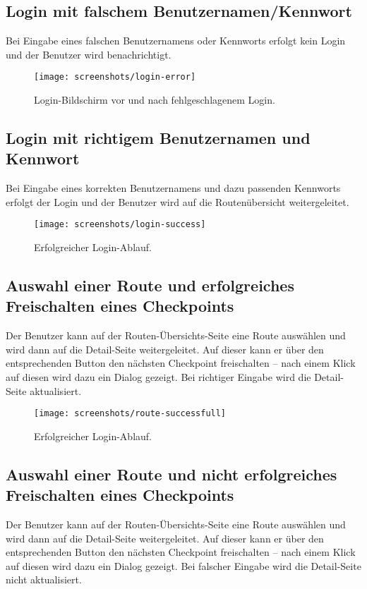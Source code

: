 \documentclass[a4paper,ngerman]{scrartcl}
\begin{document}
\subsection{Login mit falschem Benutzernamen/Kennwort}
Bei Eingabe eines falschen Benutzernamens oder Kennworts erfolgt kein Login und der Benutzer wird benachrichtigt.

\begin{figure}[h]
\centering
\texttt{[image: screenshots/login-error]}
\caption{Login-Bildschirm vor und nach fehlgeschlagenem Login.}
\label{fig:GraphDb}
\end{figure}

\newpage
\subsection{Login mit richtigem Benutzernamen und Kennwort}
Bei Eingabe eines korrekten Benutzernamens und dazu passenden Kennworts erfolgt der Login und der Benutzer wird auf die Routenübersicht weitergeleitet.


\begin{figure}[h]
\centering
\texttt{[image: screenshots/login-success]}
\caption{Erfolgreicher Login-Ablauf.}
\label{fig:GraphDb}
\end{figure}

\newpage
\subsection{Auswahl einer Route und erfolgreiches Freischalten eines Checkpoints}
Der Benutzer kann auf der Routen-Übersichts-Seite eine Route auswählen und wird dann auf die Detail-Seite weitergeleitet. Auf dieser kann er über den entsprechenden Button den nächsten Checkpoint freischalten -- nach einem Klick auf diesen wird dazu ein Dialog gezeigt. Bei richtiger Eingabe wird die Detail-Seite aktualisiert.


\begin{figure}[h]
\centering
\texttt{[image: screenshots/route-successfull]}
\caption{Erfolgreicher Login-Ablauf.}
\label{fig:GraphDb}
\end{figure}

\subsection{Auswahl einer Route und nicht erfolgreiches Freischalten eines Checkpoints}
Der Benutzer kann auf der Routen-Übersichts-Seite eine Route auswählen und wird dann auf die Detail-Seite weitergeleitet. Auf dieser kann er über den entsprechenden Button den nächsten Checkpoint freischalten -- nach einem Klick auf diesen wird dazu ein Dialog gezeigt. Bei falscher Eingabe wird die Detail-Seite nicht aktualisiert.
\end{document}
